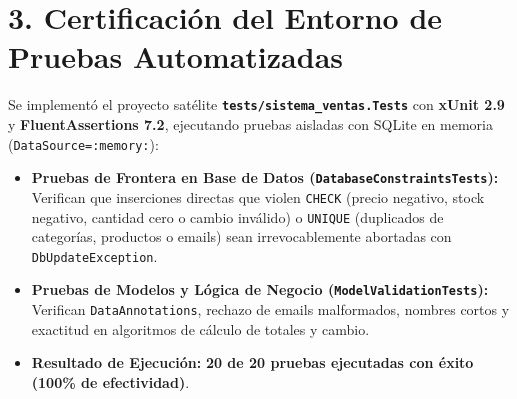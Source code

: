 \documentclass[10pt,a4paper,landscape]{article}
\begin{document}
\vspace{0.5em}

\section*{3. Certificación del Entorno de Pruebas Automatizadas}
Se implementó el proyecto satélite \textbf{\texttt{tests/sistema\_ventas.Tests}} con \textbf{xUnit 2.9} y \textbf{FluentAssertions 7.2}, ejecutando pruebas aisladas con SQLite en memoria (\texttt{DataSource=:memory:}):

\begin{itemize}[leftmargin=1.5em, itemsep=0.1em]
    \item \textbf{Pruebas de Frontera en Base de Datos (\texttt{DatabaseConstraintsTests}):} Verifican que inserciones directas que violen \texttt{CHECK} (precio negativo, stock negativo, cantidad cero o cambio inválido) o \texttt{UNIQUE} (duplicados de categorías, productos o emails) sean irrevocablemente abortadas con \texttt{DbUpdateException}.
    \item \textbf{Pruebas de Modelos y Lógica de Negocio (\texttt{ModelValidationTests}):} Verifican \texttt{DataAnnotations}, rechazo de emails malformados, nombres cortos y exactitud en algoritmos de cálculo de totales y cambio.
    \item \textbf{Resultado de Ejecución:} \textcolor{success}{\textbf{20 de 20 pruebas ejecutadas con éxito (100\% de efectividad)}}.
\end{itemize}
\end{document}
